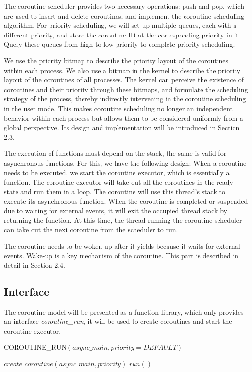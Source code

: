 \documentclass[conference]{IEEEtran}
\begin{document}
The coroutine scheduler provides two necessary operations: push and pop, which are used to insert and delete coroutines, and implement the coroutine scheduling algorithm. For priority scheduling, we will set up multiple queues, each with a different priority, and store the coroutine ID at the corresponding priority in it. Query these queues from high to low priority to complete priority scheduling. 

We use the priority bitmap to describe the priority layout of the coroutines within each process. We also use a bitmap in the kernel to describe the priority layout of the coroutines of all processes. The kernel can perceive the existence of coroutines and their priority through these bitmaps, and formulate the scheduling strategy of the process, thereby indirectly intervening in the coroutine scheduling in the user mode. This makes coroutine scheduling no longer an independent behavior within each process but allows them to be considered uniformly from a global perspective. Its design and implementation will be introduced in Section 2.3.

The execution of functions must depend on the stack, the same is valid for asynchronous functions. For this, we have the following design: When a coroutine needs to be executed, we start the coroutine executor, which is essentially a function. The coroutine executor will take out all the coroutines in the ready state and run them in a loop. The coroutine will use this thread's stack to execute its asynchronous function. When the coroutine is completed or suspended due to waiting for external events, it will exit the occupied thread stack by returning the function. At this time, the thread running the coroutine scheduler can take out the next coroutine from the scheduler to run.

The coroutine needs to be woken up after it yields because it waits for external events. Wake-up is a key mechanism of the coroutine. This part is described in detail in Section 2.4.

\subsection{Interface}
The coroutine model will be presented as a function library, which only provides an interface-\emph{coroutine\_run}, it will be used to create coroutines and start the coroutine executor.

\begin{algorithm}[!h]
    \caption{COROUTINE\_RUN$(async\_main, priority = DEFAULT)$}
    \label{Algorithm 1}
    \begin{algorithmic}
        \STATE $create\_coroutine(async\_main, priority)$
        \STATE $run()$
        \ENDIF
    \end{algorithmic}

\end{algorithm}
\end{document}
